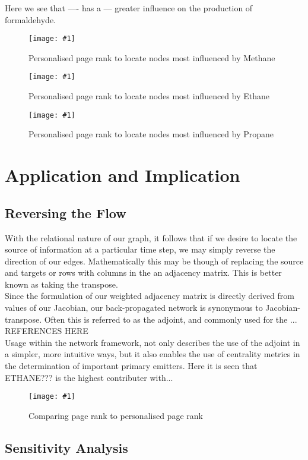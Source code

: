 \documentclass[twoside,reqno]{article}
\newcommand{\qfig}[4]{\begin{figure}[H]\centering\texttt{[image: \#1]}\caption{#3}\label{#2}\end{figure}\newpage}
\begin{document}
Here we see that ---- has a --- greater influence on the production of formaldehyde.


\qfig{newfigs/ch2_methane.pdf}{fig:prmeth}{Personalised page rank to locate nodes most influenced by Methane}{\textwidth}


\qfig{newfigs/ch2_ethane.pdf}{fig:preth}{Personalised page rank to locate nodes most influenced by Ethane}{\textwidth}


\qfig{newfigs/ch2_propane.pdf}{fig:prprop}{Personalised page rank to locate nodes most influenced by Propane}{\textwidth}



\section{Application and Implication}

\subsection{Reversing the Flow}\label{sec:reverse}

With the relational nature of our graph, it follows that if we desire to locate the source of information at a particular time step, we may simply reverse the direction of our edges. Mathematically this may be though of replacing the source and targets or rows with columns in the an adjacency matrix. This is better known as taking the transpose.\\

Since the formulation of our weighted adjacency matrix is directly derived from values of our Jacobian, our back-propagated network is synonymous to Jacobian-transpose. Often this is referred to as the adjoint, and commonly used for the ... REFERENCES HERE  \\



Usage within the network framework, not only describes the use of the adjoint in a simpler, more intuitive ways, but it also enables the use of centrality metrics in the determination of important primary emitters. Here it is seen that ETHANE??? is the highest contributer with...

\qfig{newfigs/ch2_pagerank_all.pdf}{fig:prrpr}{Comparing page rank to personalised page rank}{\textwidth}



\subsection{Sensitivity Analysis}
\end{document}
